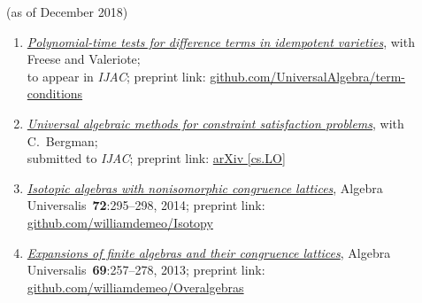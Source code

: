 \documentclass{article}
\begin{document}
\thispagestyle{empty}

 (as of December 2018)

\vskip1cm
    \begin{enumerate}
    \item \href{https://github.com/UniversalAlgebra/term-conditions/tree/master/ijac}{{\it Polynomial-time tests for difference terms in idempotent varieties}},
      with Freese and Valeriote;\\
      to appear in {\small {\it IJAC}}; preprint link: \href{https://github.com/UniversalAlgebra/term-conditions/tree/master/DiffTerm}{github.com/UniversalAlgebra/term-conditions}

    \item \href{https://goo.gl/nXC1i9} %
         {{\it Universal algebraic methods for constraint satisfaction problems}},
         with C.~Bergman;\\
         submitted to {\small {\it IJAC}};
         preprint link: \href{https://arxiv.org/abs/1611.02867}{arXiv [cs.LO]}

    \item \href{https://github.com/williamdemeo/Isotopy}{{\it Isotopic algebras with nonisomorphic congruence lattices}},
    Algebra Universalis~{\bf 72}:295--298, 2014; 
         preprint link: \href{https://github.com/williamdemeo/Isotopy}{github.com/williamdemeo/Isotopy}

    \item \href{https://github.com/williamdemeo/Overalgebras}{{\it Expansions of finite algebras and their congruence lattices}},
    Algebra Universalis~{\bf 69}:257--278, 2013; preprint link: \href{https://github.com/williamdemeo/Overalgebras}{github.com/williamdemeo/Overalgebras}
    \end{enumerate}

    \vskip1cm
\end{document}
